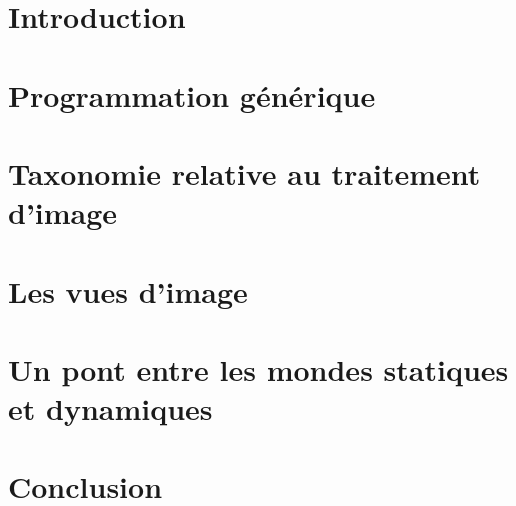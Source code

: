 \section{Introduction}

\section{Programmation générique}

\section{Taxonomie relative au traitement d'image}

\section{Les vues d'image}

\section{Un pont entre les mondes statiques et dynamiques}

\section{Conclusion}
